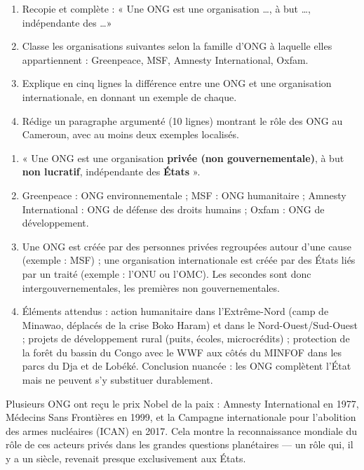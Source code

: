 \documentclass[11pt]{article}
\begin{document}
\begin{exercice}
\begin{enumerate}
\item Recopie et complète : « Une ONG est une organisation \ldots, à but \ldots, indépendante des \ldots »
\item Classe les organisations suivantes selon la famille d'ONG à laquelle elles appartiennent : Greenpeace, MSF, Amnesty International, Oxfam.
\item Explique en cinq lignes la différence entre une ONG et une organisation internationale, en donnant un exemple de chaque.
\item Rédige un paragraphe argumenté (10 lignes) montrant le rôle des ONG au Cameroun, avec au moins deux exemples localisés.
\end{enumerate}
\end{exercice}

\begin{corrige}
\begin{enumerate}
\item « Une ONG est une organisation \textbf{privée (non gouvernementale)}, à but \textbf{non lucratif}, indépendante des \textbf{États} ».
\item Greenpeace : ONG environnementale ; MSF : ONG humanitaire ; Amnesty International : ONG de défense des droits humains ; Oxfam : ONG de développement.
\item Une ONG est créée par des personnes privées regroupées autour d'une cause (exemple : MSF) ; une organisation internationale est créée par des États liés par un traité (exemple : l'ONU ou l'OMC). Les secondes sont donc intergouvernementales, les premières non gouvernementales.
\item Éléments attendus : action humanitaire dans l'Extrême-Nord (camp de Minawao, déplacés de la crise Boko Haram) et dans le Nord-Ouest/Sud-Ouest ; projets de développement rural (puits, écoles, microcrédits) ; protection de la forêt du bassin du Congo avec le WWF aux côtés du MINFOF dans les parcs du Dja et de Lobéké. Conclusion nuancée : les ONG complètent l'État mais ne peuvent s'y substituer durablement.
\end{enumerate}
\end{corrige}

\begin{savaistu}
Plusieurs ONG ont reçu le prix Nobel de la paix : Amnesty International en 1977, Médecins Sans Frontières en 1999, et la Campagne internationale pour l'abolition des armes nucléaires (ICAN) en 2017. Cela montre la reconnaissance mondiale du rôle de ces acteurs privés dans les grandes questions planétaires — un rôle qui, il y a un siècle, revenait presque exclusivement aux États.
\end{savaistu}
\end{document}
